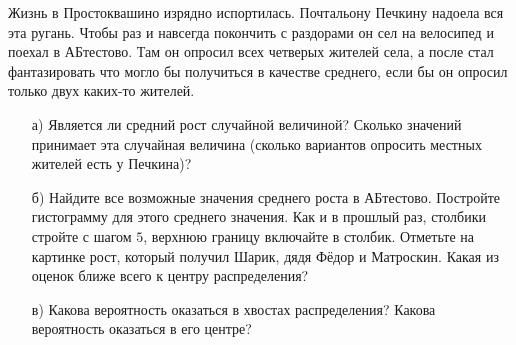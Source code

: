 \documentclass[12pt, a4paper, oneside]{article}
\begin{document}
Жизнь в Простоквашино изрядно испортилась. Почтальону Печкину надоела вся эта ругань. Чтобы раз и навсегда покончить с раздорами он сел на велосипед и поехал в АБтестово. Там он опросил всех четверых жителей села, а после стал фантазировать что могло бы получиться в качестве среднего, если бы он опросил только двух каких-то жителей. 

\begin{enumerate} 
	\item[а)] Является ли средний рост случайной величиной? Сколько значений принимает эта случайная величина (сколько вариантов опросить местных жителей есть у Печкина)?
	\item[б)] Найдите все возможные значения среднего роста в АБтестово. Постройте гистограмму для этого среднего значения. Как и в прошлый раз, столбики стройте с шагом $5$, верхнюю границу включайте в столбик. Отметьте на картинке рост, который получил Шарик, дядя Фёдор и Матроскин. Какая из оценок ближе всего к центру распределения? 
	\item[в)] Какова вероятность оказаться в хвостах распределения? Какова вероятность оказаться в его центре? 
\end{enumerate} 
\end{document}
